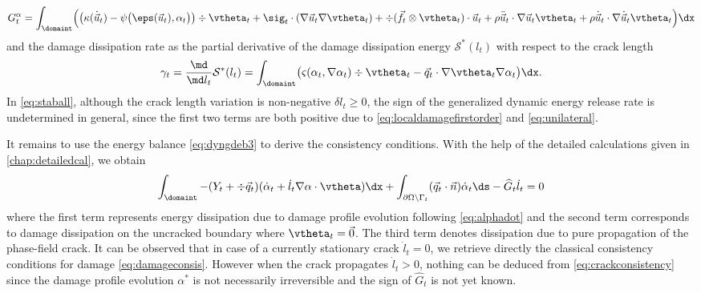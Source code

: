\begin{equation} \label{eq:GtC}
G_t^\alpha=\int_\domaint\Bigl(\bigl(\kappa(\dot{\vec{u}}_t)-\psi\bigl(\eps(\vec{u}_t),\alpha_t\bigr)\bigr)\div\vtheta_t+\sig_t\cdot(\nabla\vec{u}_t\nabla\vtheta_t)+\div(\vec{f}_t\otimes\vtheta_t)\cdot\vec{u}_t+\rho\ddot{\vec{u}}_t\cdot\nabla\vec{u}_t\vtheta_t+\rho\dot{\vec{u}}_t\cdot\nabla\dot{\vec{u}}_t\vtheta_t\Bigr)\dx
\end{equation}
and the damage dissipation rate as the partial derivative of the damage dissipation energy $\mathcal{S}^*(l_t)$ with respect to the crack length
\begin{equation} \label{eq:Gammat}
\gamma_t=\frac{\md}{\md l_t}\mathcal{S}^*(l_t)=\int_\domaint\bigl(\varsigma(\alpha_t,\nabla\alpha_t)\div\vtheta_t-\vec{q}_t\cdot\nabla\vtheta_t\nabla\alpha_t\bigr)\dx.
\end{equation}
In \eqref{eq:staball}, although the crack length variation is non-negative $\delta l_t\geq 0$, the sign of the generalized dynamic energy release rate is undetermined in general, since the first two terms are both positive due to \eqref{eq:localdamagefirstorder} and \eqref{eq:unilateral}.

It remains to use the energy balance \eqref{eq:dyngdeb3} to derive the consistency conditions. With the help of the detailed calculations given in \cref{chap:detailedcal}, we obtain
\begin{equation} \label{eq:crackconsistency}
\int_\domaint-(Y_t+\div\vec{q}_t)(\dot{\alpha}_t+\dot{l}_t\nabla\alpha\cdot\vtheta)\dx+\int_{\partial\Omega\setminus\Gamma_t}(\vec{q}_t\cdot\vec{n})\dot{\alpha}_t\ds-\widehat{G}_t\dot{l}_t=0
\end{equation}
where the first term represents energy dissipation due to damage profile evolution following \eqref{eq:alphadot} and the second term corresponds to damage dissipation on the uncracked boundary where $\vtheta_t=\vec{0}$. The third term denotes dissipation due to pure propagation of the phase-field crack.  It can be observed that in case of a currently stationary crack $\dot{l}_t=0$, we retrieve directly the classical consistency conditions for damage \eqref{eq:damageconsis}. However when the crack propagates $\dot{l}_t>0$, nothing can be deduced from \eqref{eq:crackconsistency} since the damage profile evolution $\alpha^*$ is not necessarily irreversible and the sign of $\widehat{G}_t$ is not yet known.

